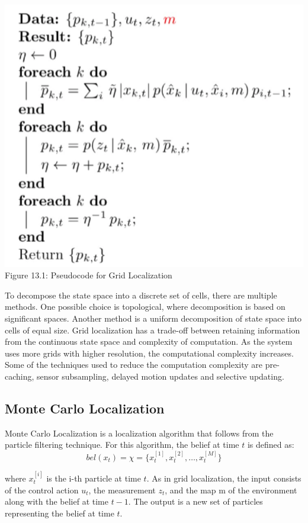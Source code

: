 \begin{center}
\includegraphics[scale = 0.5]{gridLocalization.png}\\
Figure 13.1: Pseudocode for Grid Localization
\end{center}

To decompose the state space into a discrete set of cells, there are multiple methods. One possible choice is topological, where decomposition is based on significant spaces. Another method is a uniform decomposition of state space into cells of equal size. Grid localization has a trade-off between retaining information from the continuous state space and complexity of computation. As the system uses more grids with higher resolution, the computational complexity increases. Some of the techniques used to reduce the computation complexity are pre-caching, sensor subsampling, delayed motion updates and selective updating.

\subsection{Monte Carlo Localization}
Monte Carlo Localization is a localization algorithm that follows from the particle filtering technique. For this algorithm, the belief at time $t$ is defined as:
$$ bel(x_t) = \chi = \{x_t^{[1]}, x_t^{[2]}, \ldots , x_t^{[M]}\} $$

where $x_t^{[i]}$ is the i-th particle at time $t$. As in grid localization, the input consists of the control action $u_t$, the measurement $z_t$, and the map m of the environment along with the belief at time $t-1$. The output is a new set of particles representing the belief at time $t$.

